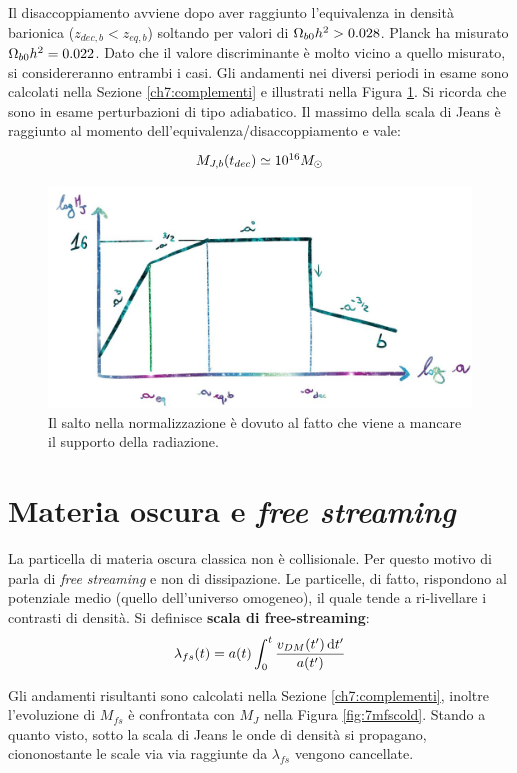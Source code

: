 Il disaccoppiamento avviene dopo aver raggiunto l'equivalenza in densità barionica ($z_{dec,b}<z_{eq,b}$) soltando per valori di $\Omega_{b0} h^2 > 0.028$. Planck ha misurato $\Omega_{b0} h^2 = 0.022$. Dato che il valore discriminante è molto vicino a quello misurato, si considereranno entrambi i casi. Gli andamenti nei diversi periodi in esame sono calcolati nella Sezione \ref{ch7:complementi} e illustrati nella Figura \ref{fig:7mjbar}. Si ricorda che sono in esame perturbazioni di tipo adiabatico. Il massimo della scala di Jeans è raggiunto al momento dell'equivalenza/disaccoppiamento e vale:
\begin{equation}\left.
    \def\arraystretch{1.3}
        \begin{array}{l}
     M_{J,b} (t_{dec}) \simeq 10^{16} M_\odot\\
    \end{array}\right.
\end{equation}
\begin{figure}[H]
    \centering
    \includegraphics[width=.9 \textwidth]{Pictures/7/mjbar.jpg}
    \caption{Il salto nella normalizzazione è dovuto al fatto che viene a mancare il supporto della radiazione.}\label{fig:7mjbar}
\end{figure}

\section{Materia oscura e \textit{free streaming}}
La particella di materia oscura classica non è collisionale. Per questo motivo di parla di \textit{free streaming} e non di dissipazione. Le particelle, di fatto, rispondono al potenziale medio (quello dell'universo omogeneo), il quale tende a ri-livellare i contrasti di densità. Si definisce \textbf{scala di free-streaming}:
$$
\lambda_{fs}(t) = a(t)\int_0^t \frac{v_{DM}(t')\operatorname{d}\!{t'}}{a(t')}
$$

Gli andamenti risultanti sono calcolati nella Sezione \ref{ch7:complementi}, inoltre l'evoluzione di $M_{fs}$ è confrontata con $M_J$ nella Figura \ref{fig:7mfscold}. Stando a quanto visto, sotto la scala di Jeans le onde di densità si propagano, ciononostante le scale via via raggiunte da $\lambda_{fs}$ vengono cancellate.

